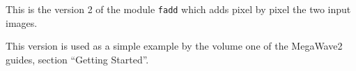 This is the version 2 of the module \verb+fadd+
which adds pixel by pixel the two input images. 

This version is used as a simple example
by the volume one of the MegaWave2 guides,
section ``Getting Started''.
